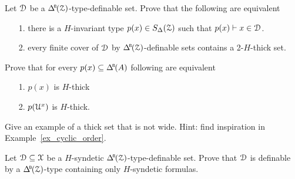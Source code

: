 \begin{exercise}
  Let $\EuScript D$ be a $\BDelta(\Z)$-type-definable set.
  Prove that the following are equivalent 
  \begin{itemize}
    \item[1.] there is a $H$-invariant type $p(x)\in S_\Delta(\EuScript Z)$ such that $p(x)\vdash x\in\EuScript D$.
    \item[2.] every finite cover of $\EuScript D$ by $\BDelta(\Z)$-definable sets contains a 2-$H$-thick set.
  \end{itemize}
\end{exercise}


\begin{exercise}\label{ex_thick_types}
  Prove that for every $p(x)\subseteq \BDelta(A)$ following are equivalent
  \begin{itemize}
    \item[1.] $p(x)$ is $H$-thick
    \item[2.] $p(\EuScript U^x)$ is $H$-thick.
  \end{itemize}
\end{exercise}

\begin{exercise}
  Give an example of a thick set that is not wide.
  Hint: find inspiration in Example~\ref{ex_cyclic_order}.
\end{exercise}

\begin{exercise}\label{ex_syndetic_type_vs_formulas}
  Let $\EuScript D\subseteq\EuScript X$ be a $H$-syndetic $\BDelta(\Z)$-type-definable set.
  Prove that $\EuScript D$ is definable by a $\BDelta(\Z)$-type containing only $H$-syndetic formulas.
\end{exercise}




